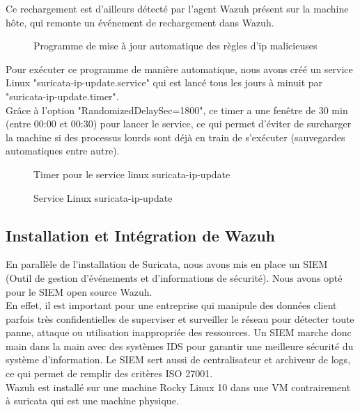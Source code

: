 \documentclass[a4paper, 11pt]{article}
\begin{document}
Ce rechargement est d'ailleurs détecté par l'agent Wazuh présent sur la machine hôte, qui remonte un événement de rechargement dans Wazuh.\\
\newpage
\begin{figure}[H]
    \centering
    
  \label{fig:suricata-ip-update}
  \caption{Programme de mise à jour automatique des règles d'ip malicieuses}
\end{figure}
\par\bigskip
Pour exécuter ce programme de manière automatique, nous avons créé un service Linux "suricata-ip-update.service" qui est lancé tous les jours à minuit par "suricata-ip-update.timer".\\
Grâce à l'option "RandomizedDelaySec=1800", ce timer a une fenêtre de 30 min (entre 00:00 et 00:30) pour lancer le service, ce qui permet d'éviter de surcharger la machine si des processus lourds sont déjà en train de s'exécuter (sauvegardes automatiques entre autre).\\
\newpage
\begin{figure}[H]
    \centering
    
  \label{fig:suricata-ip-update-timer}
  \caption{Timer pour le service linux suricata-ip-update}
\end{figure}
\par\bigskip
\begin{figure}[H]
    \centering
    
  \label{fig:suricata-ip-update-service}
  \caption{Service Linux suricata-ip-update}
\end{figure}
\par\bigskip

\subsection{Installation et Intégration de Wazuh}

En parallèle de l'installation de Suricata, nous avons mis en place un SIEM (Outil de gestion d'événements et d'informations de sécurité). Nous avons opté pour le SIEM open source Wazuh.\\
En effet, il est important pour une entreprise qui manipule des données client parfois très confidentielles de superviser et surveiller le réseau pour détecter toute panne, attaque ou utilisation inappropriée des ressources.
Un SIEM marche donc main dans la main avec des systèmes IDS pour garantir une meilleure sécurité du système d'information. Le SIEM sert aussi de centralisateur et archiveur de logs, ce qui permet de remplir des critères ISO 27001.\\
Wazuh est installé sur une machine Rocky Linux 10 dans une VM contrairement à suricata qui est une machine physique.
\newpage
\end{document}
